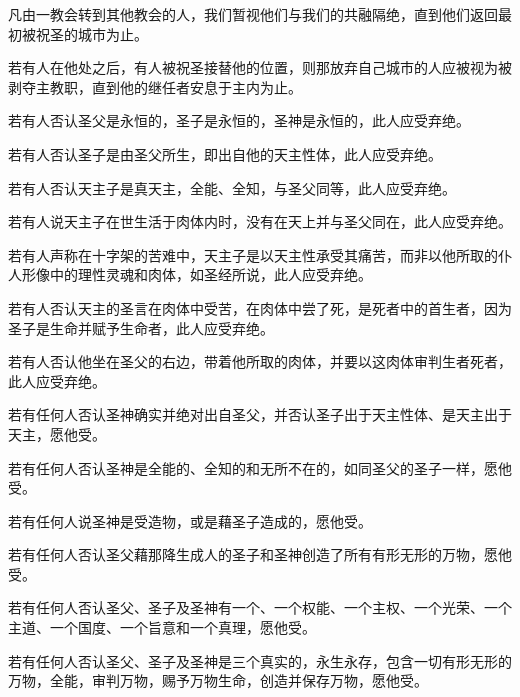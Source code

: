 凡由一教会转到其他教会的人，我们暂视他们与我们的共融隔绝，直到他们返回最初被祝圣的城市为止。\par

若有人在他处之后，有人被祝圣接替他的位置，则那放弃自己城市的人应被视为被剥夺主教职，直到他的继任者安息于主内为止。\par

若有人否认圣父是永恒的，圣子是永恒的，圣神是永恒的，此人应受弃绝。\par

若有人否认圣子是由圣父所生，即出自他的天主性体，此人应受弃绝。\par

若有人否认天主子是真天主，全能、全知，与圣父同等，此人应受弃绝。\par

若有人说天主子在世生活于肉体内时，没有在天上并与圣父同在，此人应受弃绝。\par

若有人声称在十字架的苦难中，天主子是以天主性承受其痛苦，而非以他所取的仆人形像中的理性灵魂和肉体，如圣经所说，此人应受弃绝。\par

若有人否认天主的圣言在肉体中受苦，在肉体中尝了死，是死者中的首生者，因为圣子是生命并赋予生命者，此人应受弃绝。\par

若有人否认他坐在圣父的右边，带着他所取的肉体，并要以这肉体审判生者死者，此人应受弃绝。\par

若有任何人否认圣神确实并绝对出自圣父，并否认圣子出于天主性体、是天主出于天主，愿他受。\par

若有任何人否认圣神是全能的、全知的和无所不在的，如同圣父的圣子一样，愿他受。\par

若有任何人说圣神是受造物，或是藉圣子造成的，愿他受。\par

若有任何人否认圣父藉那降生成人的圣子和圣神创造了所有有形无形的万物，愿他受。\par

若有任何人否认圣父、圣子及圣神有一个、一个权能、一个主权、一个光荣、一个主道、一个国度、一个旨意和一个真理，愿他受。\par

若有任何人否认圣父、圣子及圣神是三个真实的，永生永存，包含一切有形无形的万物，全能，审判万物，赐予万物生命，创造并保存万物，愿他受。\par

